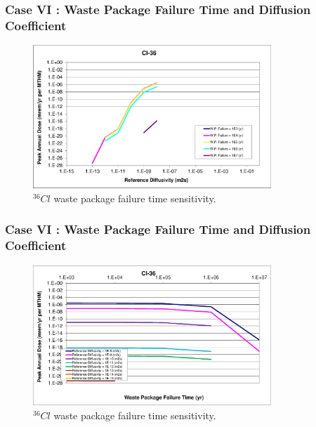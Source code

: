 \begin{frame}[c]
  \frametitle{Case VI : Waste Package Failure Time and Diffusion Coefficient}

\begin{figure}[ht!]
\centering
\includegraphics[width=0.8\textwidth]{WPFailExtended/Cl-36.eps}
\caption{$^{36}Cl$ waste package failure time sensitivity. }
\label{fig:WPFailCl36}
\end{figure}
\end{frame}

\begin{frame}[c]
  \frametitle{Case VI : Waste Package Failure Time and Diffusion Coefficient}

\begin{figure}[ht!]
\centering
\includegraphics[width=0.8\textwidth]{WPFailExtended/Cl-36-WPFail.eps}
\caption{$^{36}Cl$ waste package failure time sensitivity. }
\label{fig:WPFailPuDaughters}
\end{figure}

\end{frame}

